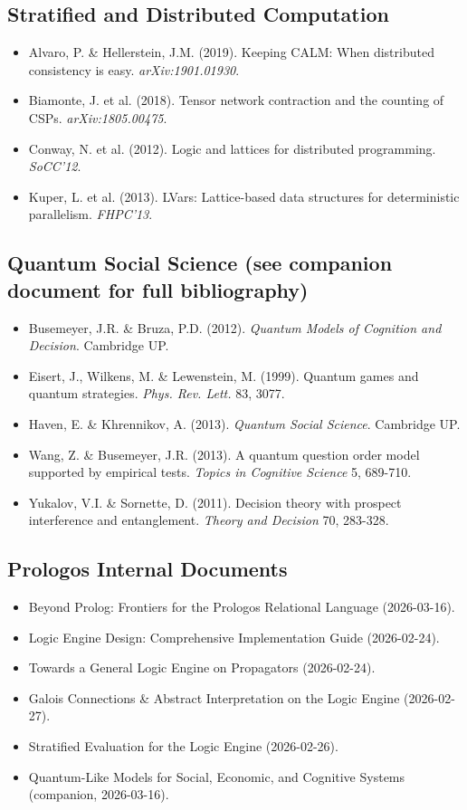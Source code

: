 \documentclass[11pt]{article}
\begin{document}
\subsection{Stratified and Distributed Computation}
\label{sec:orgadbf96a}
\begin{itemize}
\item Alvaro, P. \& Hellerstein, J.M. (2019). Keeping CALM: When distributed consistency is easy. \emph{arXiv:1901.01930}.
\item Biamonte, J. et al. (2018). Tensor network contraction and the counting of CSPs. \emph{arXiv:1805.00475}.
\item Conway, N. et al. (2012). Logic and lattices for distributed programming. \emph{SoCC'12}.
\item Kuper, L. et al. (2013). LVars: Lattice-based data structures for deterministic parallelism. \emph{FHPC'13}.
\end{itemize}
\subsection{Quantum Social Science (see companion document for full bibliography)}
\label{sec:org3948b53}
\begin{itemize}
\item Busemeyer, J.R. \& Bruza, P.D. (2012). \emph{Quantum Models of Cognition and Decision}. Cambridge UP.
\item Eisert, J., Wilkens, M. \& Lewenstein, M. (1999). Quantum games and quantum strategies. \emph{Phys. Rev. Lett.} 83, 3077.
\item Haven, E. \& Khrennikov, A. (2013). \emph{Quantum Social Science}. Cambridge UP.
\item Wang, Z. \& Busemeyer, J.R. (2013). A quantum question order model supported by empirical tests. \emph{Topics in Cognitive Science} 5, 689-710.
\item Yukalov, V.I. \& Sornette, D. (2011). Decision theory with prospect interference and entanglement. \emph{Theory and Decision} 70, 283-328.
\end{itemize}
\subsection{Prologos Internal Documents}
\label{sec:org2f25f8b}
\begin{itemize}
\item Beyond Prolog: Frontiers for the Prologos Relational Language (2026-03-16).
\item Logic Engine Design: Comprehensive Implementation Guide (2026-02-24).
\item Towards a General Logic Engine on Propagators (2026-02-24).
\item Galois Connections \& Abstract Interpretation on the Logic Engine (2026-02-27).
\item Stratified Evaluation for the Logic Engine (2026-02-26).
\item Quantum-Like Models for Social, Economic, and Cognitive Systems (companion, 2026-03-16).
\end{itemize}
\end{document}
